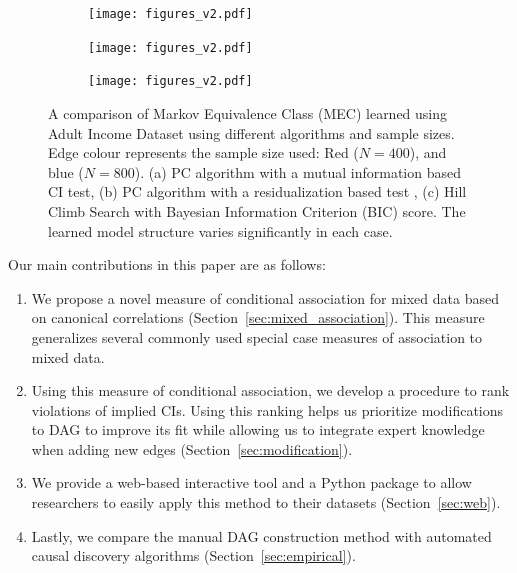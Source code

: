 \documentclass{uai2025} %
\begin{document}
\begin{figure}[t!]
    \begin{subfigure}{0.5 \textwidth}
	\centering
    	\texttt{[image: figures\_v2.pdf]}
    	\caption{}
    \end{subfigure}
    \begin{subfigure}{0.5\textwidth}
	\centering
    	\texttt{[image: figures\_v2.pdf]}
    	\caption{}
    \end{subfigure}
    \begin{subfigure}{0.5\textwidth}
	\centering
    	\texttt{[image: figures\_v2.pdf]}
    	\caption{}
    \end{subfigure}

    \caption{A comparison of Markov Equivalence Class (MEC) learned using Adult
	    Income Dataset \citep{Becker1996} using different algorithms and
	    sample sizes. Edge colour represents the sample size used: Red
	    ($N=400$), and blue ($N=800$). (a) PC algorithm with a mutual
	    information based CI test, (b) PC algorithm with a residualization
	    based test \citep{Ankan2023}, (c) Hill Climb Search with Bayesian
	    Information Criterion (BIC) score. The learned model structure
	    varies significantly in each case.}
    \label{fig:intro}
\end{figure}


Our main contributions in this paper are as follows:

\begin{enumerate}
    \item We propose a novel measure of conditional association for mixed data
	    based on canonical correlations
	    (Section~\ref{sec:mixed_association}). This measure generalizes
	    several commonly used special case measures of association to mixed
	    data.
    \item Using this measure of conditional association, we develop a procedure
	    to rank violations of implied CIs. Using this ranking helps us
	    prioritize modifications to DAG to improve its fit while allowing
	    us to integrate expert knowledge when adding new edges (Section~\ref{sec:modification}).
    \item We provide a web-based interactive tool and a Python package to allow 
	    researchers to easily apply this method to their datasets (Section~\ref{sec:web}).
    \item Lastly, we compare the manual DAG construction method with automated
	    causal discovery algorithms (Section~\ref{sec:empirical}).
\end{enumerate}
\end{document}

